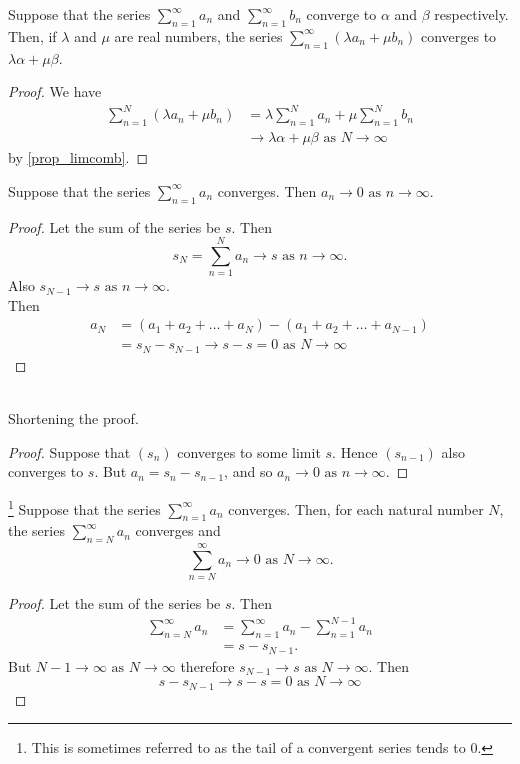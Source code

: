 \documentclass[10pt, a4paper]{article}
\newcommand{\limas}[3][n]{#2 \rightarrow #3 \text{ as } #1 \rightarrow \infty}
\newcommand{\sumfrto}[3][n = 1]{\sum_{#1}^{#2}{#3}} %
\newcommand{\sumto}[2][\infty]{\sumfrto{#1}{#2}}
\begin{document}
\begin{theorem}
    Suppose that the series $\sumto{a_n}$ and $\sumto{b_n}$ converge to $\alpha$ and $\beta$ respectively. Then, if $\lambda$ and $\mu$ are real numbers, the series $\sumto{(\lambda a_n + \mu b_n)}$ converges to $\lambda\alpha + \mu\beta$.
    \begin{proof}
        We have
        \begin{align*}
            \sumto[N]{(\lambda a_n + \mu b_n)} &= \lambda \sumto[N]{a_n} + \mu \sumto[N]{b_n} \\ &\limas[N]{}{\lambda\alpha + \mu\beta} %
        \end{align*}
        by \autoref{prop_limcomb}.
    \end{proof}
\end{theorem}

\begin{theorem}
    Suppose that the series $\sumto{a_n}$ converges. Then $\limas{a_n}{0}$.
    \begin{proof}
        Let the sum of the series be $s$. Then \\
        \[
        s_N = \limas{\sumto[N]{a_n}}{s}.
        \]
        Also $\limas{s_{N - 1}}{s}$. \\
        Then
        \begin{align*}
            a_N &= (a_1 + a_2 + \dotsc + a_N) - (a_1 + a_2 + \dotsc + a_{N - 1}) \\
            &= \limas[N]{s_N - s_{N - 1}}{s - s = 0}
        \end{align*}
    \end{proof}
    \phantom{} \\
    Shortening the proof.
    \begin{proof}
        Suppose that $(s_n)$ converges to some limit $s$. Hence $(s_{n - 1})$ also converges to $s$. But $a_n = s_n - s_{n - 1}$, and so $\limas{a_n}{0}$.
    \end{proof}
\end{theorem}

\begin{proposition}\label{prop_series_tailconv}\footnote{This is sometimes referred to as the tail of a convergent series tends to $0$.}
    Suppose that the series $\sumto{a_n}$ converges. Then, for each natural number $N$, the series $\sum_{n = N}^{\infty}{a_n}$ converges and
    \[
    \limas[N]{\sum_{n = N}^{\infty}{a_n}}{0}.
    \]
    \begin{proof}
        Let the sum of the series be $s$. Then
        \begin{align*}
            \sum_{n = N}^{\infty}{a_n} &= \sumto{a_n} - \sumto[N - 1]{a_n} \\  
            &= s - s_{N - 1}.
        \end{align*}
        But $\limas[N]{N - 1}{\infty}$ therefore $\limas[N]{s_{N - 1}}{s}$. Then
        \[
        s - s_{N - 1} \limas[N]{}{s - s = 0}
        \]
    \end{proof}
\end{proposition}
\end{document}

